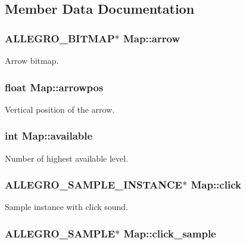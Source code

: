 \subsection{Member Data Documentation}
\hypertarget{structMap_a607f79d7c594540ebf58f88fb999250d}{
\subsubsection[{arrow}]{\setlength{\rightskip}{0pt plus 5cm}A\-L\-L\-E\-G\-R\-O\-\_\-\-B\-I\-T\-M\-A\-P$\ast$ Map\-::arrow}}\label{structMap_a607f79d7c594540ebf58f88fb999250d}
Arrow bitmap. \hypertarget{structMap_a4f395f7bdf7bc0782e29e996e87237bb}{
\subsubsection[{arrowpos}]{\setlength{\rightskip}{0pt plus 5cm}float Map\-::arrowpos}}\label{structMap_a4f395f7bdf7bc0782e29e996e87237bb}
Vertical position of the arrow. \hypertarget{structMap_aa000e129cf19d6d6d9a78cfce0ef58fc}{
\subsubsection[{available}]{\setlength{\rightskip}{0pt plus 5cm}int Map\-::available}}\label{structMap_aa000e129cf19d6d6d9a78cfce0ef58fc}
Number of highest available level. \hypertarget{structMap_a32370a5fb75fcf7d0bebd210cb2a0985}{
\subsubsection[{click}]{\setlength{\rightskip}{0pt plus 5cm}A\-L\-L\-E\-G\-R\-O\-\_\-\-S\-A\-M\-P\-L\-E\-\_\-\-I\-N\-S\-T\-A\-N\-C\-E$\ast$ Map\-::click}}\label{structMap_a32370a5fb75fcf7d0bebd210cb2a0985}
Sample instance with click sound. \hypertarget{structMap_abcd15a027ece6075efe4baaf99c7595d}{
\subsubsection[{click\-\_\-sample}]{\setlength{\rightskip}{0pt plus 5cm}A\-L\-L\-E\-G\-R\-O\-\_\-\-S\-A\-M\-P\-L\-E$\ast$ Map\-::click\-\_\-sample}}\label{structMap_abcd15a027ece6075efe4baaf99c7595d}
